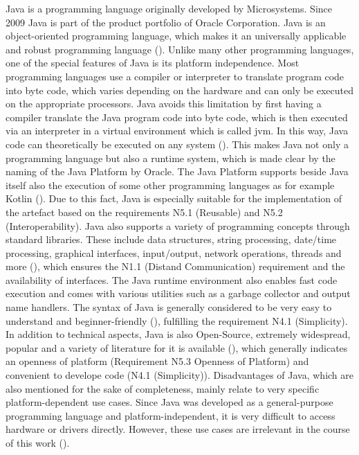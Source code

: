 Java is a programming language originally developed by Microsystems. Since 2009 Java is part of the product portfolio of Oracle Corporation. Java is an object-oriented programming language, which makes it an universally applicable and robust programming language (\cite{Ullenboom.2017}). Unlike many other programming languages, one of the special features of Java is its platform independence. Most programming languages use a compiler or interpreter to translate program code into byte code, which varies depending on the hardware and can only be executed on the appropriate processors. Java avoids this limitation by first having a compiler translate the Java program code into byte code, which is then executed via an interpreter in a virtual environment which is called \ac{jvm}. In this way, Java code can theoretically be executed on any system (\cite{Ullenboom.2017}). This makes Java not only a programming language but also a runtime system, which is made clear by the naming of the Java Platform by Oracle. The Java Platform supports beside Java itself also the execution of some other programming languages as for example Kotlin (\cite{kotlinlang.2023}). Due to this fact, Java is especially suitable for the implementation of the artefact based on the requirements N5.1 (Reusable) and N5.2 (Interoperability). Java also supports a variety of programming concepts through standard libraries. These include data structures, string processing, date/time processing, graphical interfaces, input/output, network operations, threads and more (\cite{Ullenboom.2017}), which ensures the N1.1 (Distand Communication) requirement and the availability of interfaces. The Java runtime environment also enables fast code execution and comes with various utilities such as a garbage collector and output name handlers. The syntax of Java is generally considered to be very easy to understand and beginner-friendly (\cite{Ullenboom.2017}), fulfilling the requirement N4.1 (Simplicity). In addition to technical aspects, Java is also Open-Source, extremely widespread, popular and a variety of literature for it is available (\cite{Ullenboom.2017}), which generally indicates an openness of platform (Requirement N5.3 Openness of Platform) and convenient to develope code (N4.1 (Simplicity)). Disadvantages of Java, which are also mentioned for the sake of completeness, mainly relate to very specific platform-dependent use cases. Since Java was developed as a general-purpose programming language and platform-independent, it is very difficult to access hardware or drivers directly. However, these use cases are irrelevant in the course of this work (\cite{Ullenboom.2017}). 


